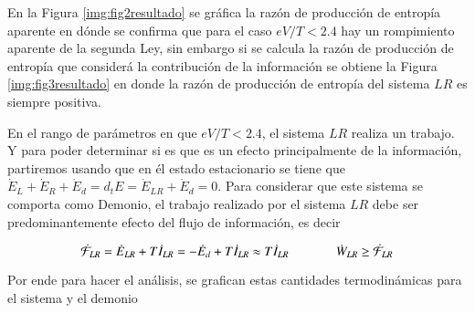 
En la Figura \ref{img:fig2resultado} se gráfica la razón de producción de entropía aparente en dónde se confirma que para el caso $eV/T<2.4$ hay un rompimiento aparente de la segunda Ley, sin embargo si se calcula la razón de producción de entropía que considerá la contribución de la información se obtiene la Figura \ref{img:fig3resultado} en donde la razón de producción de entropía del sistema $LR$ es siempre positiva.


En el rango de parámetros en que $eV/T<2.4$, el sistema $LR$ realiza un trabajo. Y para poder determinar si es que es un efecto principalmente de la información, partiremos usando que en él estado estacionario se tiene que $ \dot{E}_{L}+\dot{E}_{R}+\dot{E}_{d} = d_{t}E = \dot{E}_{LR} + \dot{E}_{d}=0$. Para considerar que este sistema se comporta como Demonio, el trabajo realizado por el sistema $LR$ debe ser predominantemente efecto del flujo de información, es decir

\begin{equation*}
    \dot{\mathcal{F}}_{LR} =  \dot{E}_{LR} + T\dot{I}_{LR} = -\dot{E}_{d} + T\dot{I}_{LR} \approx T\dot{I}_{LR}  \hspace{13mm} \dot{W}_{LR} \geq \dot{\mathcal{F}}_{LR}
\end{equation*}

Por ende para hacer el análisis, se grafican estas cantidades termodinámicas para el sistema y el demonio 


